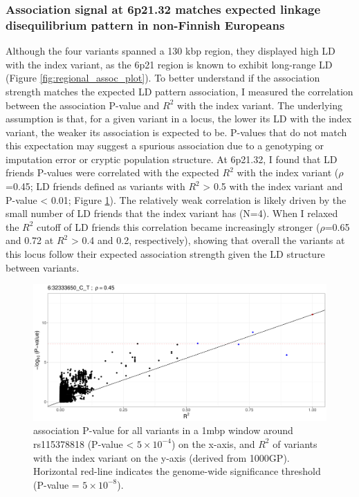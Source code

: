     \subsubsection{Association signal at 6p21.32 matches expected linkage disequilibrium pattern in non-Finnish Europeans}
    Although the four variants spanned a 130 kbp region, they displayed high LD with the index variant, as the 6p21 region is known to exhibit long-range LD (Figure \ref{fig:regional_assoc_plot}). To better understand if the association strength matches the expected LD pattern association, I measured the correlation between the association P-value and $R^{2}$ with the index variant. The underlying assumption is that, for a given variant in a locus, the lower its LD with the index variant, the weaker its association is expected to be. P-values that do not match this expectation may suggest a spurious association due to a genotyping or imputation error or cryptic population structure. At 6p21.32, I found that LD friends P-values were correlated with the expected $R^{2}$ with the index variant ($\rho$=0.45; LD friends defined as variants with $R^{2}$ > 0.5 with the index variant and P-value < 0.01; Figure \ref{fig:ld_pval_plot}). The relatively weak correlation is likely driven by the small number of LD friends that the index variant has (N=4). When I relaxed the $R^{2}$ cutoff of LD friends this correlation became increasingly stronger ($\rho$=0.65 and 0.72 at $R^{2}$ > 0.4 and 0.2, respectively), showing that overall the variants at this locus follow their expected association strength given the LD structure between variants. 




    \begin{figure}[H] 
      \centering    
      \includegraphics[width=1.0\textwidth]{fig3}
      \caption[Figure]{association P-value for all variants in a 1mbp window around rs115378818 (P-value < $5\times10^{-4}$) on the x-axis, and $R^{2}$ of variants with the index variant on the y-axis (derived from 1000GP). Horizontal red-line indicates the genome-wide significance threshold (P-value = $5\times10^{-8}$).}
      \label{fig:ld_pval_plot}
      \end{figure}


